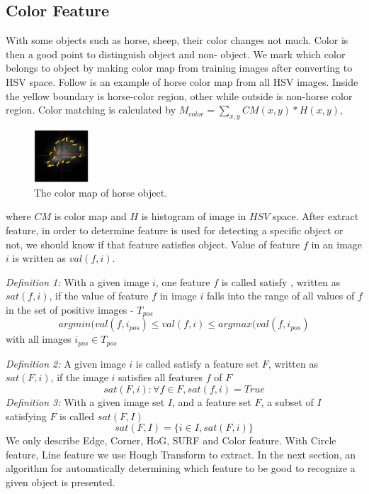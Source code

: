 \subsection{Color Feature}
With some objects such as horse, sheep,
their color changes not much. Color is then
a good point to distinguish object and non-
object. We mark which color belongs to
object by making color map from training
images after converting to HSV space.
Follow is an example of horse color map
from all HSV images. Inside the yellow
boundary is horse-color region, other
while outside is non-horse color region.
Color matching is calculated by $M_{color} = \sum_{x,y} CM(x,y) * H(x,y)$,
\begin{figure}[ht]
  \centering
  \includegraphics[width=0.80in]{images/colormap.jpg}
  \caption{The color map of horse object.}
  \label{fig:horse_color}
\end{figure}
where $CM$ is color map and $H$ is histogram of image in $HSV$ space.
After extract feature, in order to determine feature is used for
detecting a specific object or not, we should know if that feature
satisfies object. Value of feature $f$ in an image $i$ is written as $val(f,i)$.

\textit{Definition 1:} With a given image $i$, one feature $f$ is called satisfy ,
written as $sat(f,i)$, if the value of feature $f$ in image $i$ falls into the range of all
values of $f$ in the set of positive images - $T_{pos}$
\begin{equation}
   {argmin}(val(f,i_{pos}) \leq val(f,i) \leq {argmax} (val(f,i_{pos})
   \label{eq:sat_f}
\end{equation}
with all images $i_{pos} \in T_{pos}$

\textit{Definition 2:} A given image $i$ is called satisfy a feature set $F$,
written as $sat(F,i)$, if the image $i$ satisfies all features $f$ of $F$
\begin{equation}
   sat(F,i): \forall f \in F, sat(f,i) = True
   \label{eq:sat_F}
\end{equation}
\textit{Definition 3:} With a given image set $I$, and a feature set $F$, a subset of $I$ satisfying $F$ is called $sat(F,I)$ 
\begin{equation}
   sat(F,I) = \{i \in I, sat(F,i)\}
   \label{eq:sat_F_I}
\end{equation}
We only describe Edge, Corner, HoG, SURF and Color feature.
With Circle feature, Line feature we use Hough Transform to extract. In the next section, an algorithm for automatically determining which feature to be good to recognize a given object is presented.





